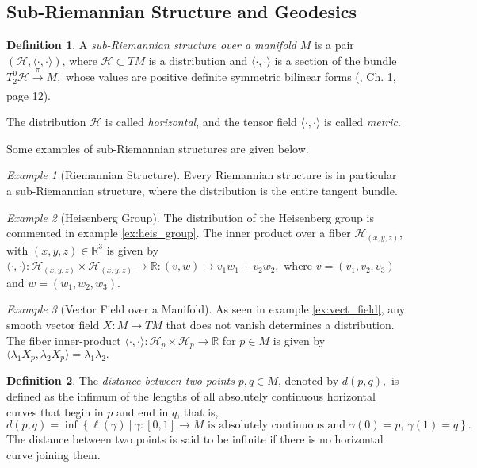 \documentclass[12pt, letterpaper, reqno]{amsart}
\theoremstyle{definition}
\newtheorem{df}{Definition}
\theoremstyle{plain}
\theoremstyle{remark}
\newtheorem{ex}{Example}
\providecommand{\DIFaddend}{} %
\DeclareRobustCommand{\DIFaddend}{\DIFOaddend \let\includegraphics\DIFOincludegraphics} %
\begin{document}
\subsection{Sub-Riemannian Structure and Geodesics}%
\label{sub:sub-Riemannian_structure_and_geodesics}
\begin{df}
	A \textit{sub-Riemannian structure over a manifold} $ M $ is a pair $ (\mathcal{H}, \langle\cdot,\cdot\rangle)$, where $ \mathcal{H}\subset TM $ is a distribution and $ \langle\cdot,\cdot\rangle $ is a section of the bundle $ T^0_2 \mathcal{H} \xrightarrow[]{\pi} M, $ whose values are positive definite symmetric bilinear forms (\cite{hatcher2003vector}, Ch. 1, page 12).

	The distribution $ \mathcal{H} $ is called \textit{horizontal}, and the tensor field $ \langle\cdot,\cdot\rangle $ is called \textit{metric}.  
\end{df}

Some examples of sub-Riemannian structures are given below.
\begin{ex}[Riemannian Structure]\label{ex:riem_geo2}
	Every Riemannian structure is in particular a sub-Riemannian structure, where the distribution is the entire tangent bundle.
\end{ex}

\begin{ex}[Heisenberg Group]\label{ex:heis_group2}
	The distribution of the Heisenberg group is commented in example \ref{ex:heis_group}. The inner product over a fiber $ \mathcal{H}_{(x,y,z)} $, with $ (x,y,z)\in \mathbb{R}^3 $  is given by $\langle\cdot,\cdot\rangle:  \mathcal{H}_{(x,y,z)}\times\mathcal{H}_{(x,y,z)} \rightarrow { \mathbb{R} }:(v,w)\mapsto v_1w_1+v_2w_2,$ where $ v=(v_1,v_2,v_3) $ and $ w=(w_1,w_2,w_3). $  

\end{ex}
\begin{ex}[Vector Field over a Manifold]\label{ex:vect_field2}
	As seen in example \ref{ex:vect_field}, any smooth vector field $ X: M \rightarrow TM$ that does not vanish determines a distribution.  The fiber inner-product $ \langle\cdot,\cdot\rangle: \mathcal{H}_p \times \mathcal{H}_p \rightarrow \mathbb{R} $ for $ p\in M $  is given by $\langle\lambda_1 X_p,\lambda_2 X_p\rangle=\lambda_1 \lambda_2.$
\end{ex}

\DIFaddend \begin{df}\label{df:horizontal_distance}
	The \textit{distance between two points} $ p,q\in M $, denoted by $ d(p,q), $   is defined as the infimum of the lengths of all absolutely continuous horizontal curves that begin in $ p $ and end in $ q $, that is, 
$$ d(p,q) = \operatorname{inf} \left\{ \ell(\gamma) \ |\ \gamma:[0,1] \rightarrow {M} \text{ is absolutely continuous and }\gamma(0)=p, \ \gamma(1)=q \right\}. $$ 
The distance between two points is said to be infinite if there is no horizontal curve joining them.
\end{df}
\end{document}
